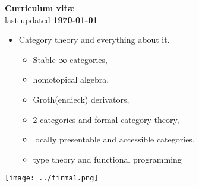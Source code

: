 \documentclass[10pt,a4paper]{article}
\begin{document}
 
\begin{center}
   \colorbox{gray!40}{\titlefont\Large\bf Curriculum vit\ae} \\[2mm]
   last updated {\bf \today}
\end{center}


\begin{itemize}
   \item[] Category theory and everything about it.
   \begin{itemize}
      \item Stable ∞-categories,
      \item homotopical algebra,
      \item Groth(endieck) derivators,
      \item 2-categories and formal category theory,
      \item locally presentable and accessible categories,
      \item type theory and functional programming
   \end{itemize} 
\end{itemize}
\vspace{\fill}\noindent%




\newpage










\vspace{\fill}
\begin{flushright}
\texttt{[image: ../firma1.png]}
\end{flushright}
\end{document}
